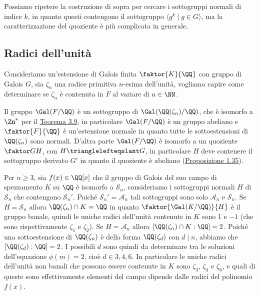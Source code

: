 \documentclass[11pt]{scrartcl}
\begin{document}
	\begin{remark}
		Possiamo ripetere la costruzione di sopra per cercare i sottogruppi 
		normali di indice $k$, in quanto questi contengono il sottogruppo
		$\langle g^k \mid g \in G\rangle$, ma la caratterizzazione del quoziente
		è più complicata in generale.
	\end{remark}
	
	\newpage
	
	\subsection{Radici dell'unità}
	
	Consideriamo un'estensione di Galois finita $\faktor{K}{\QQ}$ con gruppo di 
	Galois $G$, sia $\zeta_n$ una radice primitiva $n$-esima dell'unità, vogliamo
	capire come determinare se $\zeta_n$ è contenuta in $F$ al variare di $n \in \NN$.
	
	\begin{center}
	\end{center}
	
	Il gruppo $\Gal(F/\QQ)$ è un sottogruppo di $\Gal(\QQ(\zeta_n)/\QQ)$, che è
	isomorfo a $\Zn^*$ per il \hyperref[teorema3.9]{Teorema 3.9}, in particolare
	$\Gal(F/\QQ)$ è un gruppo abeliano e $\faktor{F}{\QQ}$ è un'estensione normale
	in quanto tutte le sottoestensioni di $\QQ(\zeta_n)$ sono normali. D'altra 
	parte $\Gal(F/\QQ)$ è isomorfo a un quoziente $\faktor G H$, con $H \trianglelefteqslant G$,
	in particolare $H$ deve contenere il sottogruppo derivato $G'$ in quanto
	il quoziente è abeliano (\hyperref[prop1.35]{Proposizione 1.35}).
	
	\begin{example}
		Per $n\geq 3$, sia $f(x) \in \QQ[x]$ che il gruppo di Galois del suo campo di spezzamento
		$K$ su $\QQ$ è isomorfo a $\mathcal{S}_n$, consideriamo i sottogruppi normali $H$ di $\mathcal{S}_n$
		che contengono $\mathcal{S}_n'$. Poiché $\mathcal{S}_n' = \mathcal{A}_n$ tali sottogruppi
		sono solo $\mathcal{A}_n$ e $\mathcal{S}_n$. Se $H = \mathcal{S}_n$ allora $\QQ(\zeta_n) \cap K = \nolinebreak\QQ$
		in quanto $\faktor{\Gal(K/\QQ)}{H}$ è il gruppo banale, quindi le uniche
		radici dell'unità contenute in $K$ sono 1 e $-1$ (che sono rispettivamente
		$\zeta_1$ e $\zeta_2$). Se $H = \mathcal{A}_n$
		allora $[\QQ(\zeta_n)\cap K: \QQ] = 2$. Poiché una sottoestensione di 
		$\QQ(\zeta_n)$ è della forma $\QQ(\zeta_d)$ con $d \mid n$, abbiamo
		che $[\QQ(\zeta_d):\QQ] = 2$. I possibili $d$ sono quindi da determinare
		tra le soluzioni dell'equazione $\phi(m) = 2$, cioè $d \in {3, 4, 6}$.
		In particolare le uniche radici dell'unità non banali che possono essere
		contenute in $K$ sono $\zeta_3$, $\zeta_4$ e $\zeta_6$, e quali di queste
		sono effettivamente elementi del campo dipende dalle radici del polinomio $f(x)$.
	\end{example}
	
\end{document}

